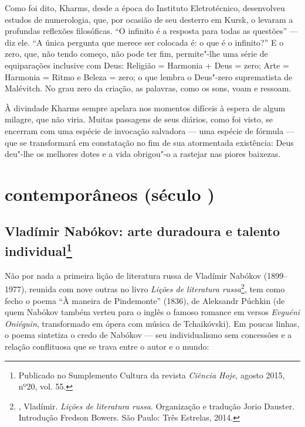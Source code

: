 {Como foi dito, Kharms, desde a época do Instituto Eletrotécnico,
desenvolveu estudos de numerologia, que, por ocasião de seu desterro em
Kursk, o levaram a profundas reflexões filosóficas. ``O infinito é a
resposta para todas as questões'' --- diz ele. ``A única pergunta que
merece ser colocada é: o que é o infinito?'' E o zero, que, não tendo
começo, não pode ter fim, permite"-lhe uma série de equiparações
inclusive com Deus: Religião = Harmonia + Deus = zero; Arte = Harmonia =
Ritmo e Beleza = zero; o que lembra o Deus"-zero suprematista de
Malévitch. No grau zero da criação, as palavras, como os sons, voam e
ressoam.

À divindade Kharms sempre apelara nos momentos difíceis à espera de
algum milagre, que não viria. Muitas passagens de seus diários, como foi
visto, se encerram com uma espécie de invocação salvadora --- uma espécie
de fórmula --- que se transformará em constatação no fim de sua
atormentada existência: Deus deu"-lhe os melhores dotes e a vida
obrigou"-o a rastejar nas piores baixezas.




\part{contemporâneos (século {})}

\chapter{Vladímir Nabókov: arte duradoura e talento individual\footnote{Publicado no Sumplemento Cultura da revista \emph{Ciência Hoje}, agosto 2015, nº20, vol. 55.}}

Não por nada a primeira lição de literatura russa de Vladímir Nabókov
(1899--1977), reunida com nove outras no livro \emph{Lições de
literatura russa}\footnote{, Vladímir. \emph{Lições de literatura russa}. Organização e tradução Jorio
Dauster. Introdução Fredson Bowers. São Paulo: Três Estrelas, 2014.}, tem como fecho o poema
``À maneira de Pindemonte'' (1836), de Aleksandr Púchkin (de quem Nabókov
também verteu para o inglês o famoso romance em versos
\emph{Evguéni Oniéguin}, transformado em ópera com música de
Tchaikóvski). Em poucas linhas, o poema sintetiza o credo de Nabókov ---
seu individualismo sem concessões e a relação conflituosa que se trava
entre o autor e o mundo:

}
